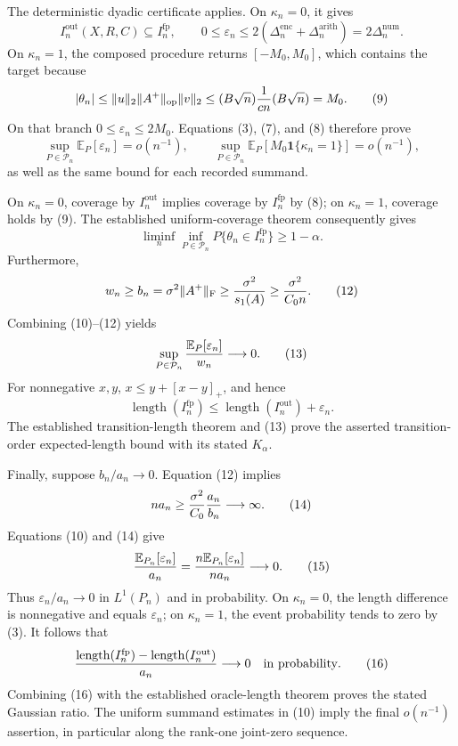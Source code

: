 The deterministic dyadic certificate applies.  On \(\kappa_n=0\), it gives
\[
I_n^{\mathrm{out}}(X,R,C)\subseteq I_n^{\mathrm{fp}},
\qquad
0\le\varepsilon_n
\le2(\Delta_n^{\mathrm{enc}}+\Delta_n^{\mathrm{arith}})
=2\Delta_n^{\mathrm{num}}.                                          \tag{8}
\]
On \(\kappa_n=1\), the composed procedure returns \([-M_0,M_0]\), which
contains the target because
\[
|\theta_n|
\le\|u\|_2\|A^+\|_{
\mathrm{op}}\|v\|_2
\le(B\sqrt n){1\over cn}(B\sqrt n)=M_0.                              \tag{9}
\]
On that branch \(0\le\varepsilon_n\le2M_0\).  Equations (3), (7), and (8)
therefore prove
\[
\sup_{P\in\mathcal P_n}\mathbb E_P[\varepsilon_n]=o(n^{-1}),
\qquad
\sup_{P\in\mathcal P_n}\mathbb E_P[
M_0\mathbf1\{\kappa_n=1\}]=o(n^{-1}),                               \tag{10}
\]
as well as the same bound for each recorded summand.

On \(\kappa_n=0\), coverage by \(I_n^{\mathrm{out}}\) implies coverage by
\(I_n^{\mathrm{fp}}\) by (8); on \(\kappa_n=1\), coverage holds by (9).
The established uniform-coverage theorem consequently gives
\[
\liminf_n\inf_{P\in\mathcal P_n}
P\{\theta_n\in I_n^{\mathrm{fp}}\}\ge1-\alpha.                       \tag{11}
\]
Furthermore,
\[
w_n\ge b_n=\sigma^2\|A^+\|_{
\mathrm F}
\ge{\sigma^2\over s_1(A)}\ge{\sigma^2\over C_0n}.                  \tag{12}
\]
Combining (10)--(12) yields
\[
\sup_{P\in\mathcal P_n}{\mathbb E_P[\varepsilon_n]\over w_n}
\longrightarrow0.                                                    \tag{13}
\]
For nonnegative \(x,y\), \(x\le y+[x-y]_+\), and hence
\[
\operatorname{length}(I_n^{\mathrm{fp}})
\le\operatorname{length}(I_n^{\mathrm{out}})+\varepsilon_n.
\]
The established transition-length theorem and (13) prove the asserted
transition-order expected-length bound with its stated \(K_\alpha\).

Finally, suppose \(b_n/a_n\to0\).  Equation (12) implies
\[
na_n\ge{\sigma^2\over C_0}{a_n\over b_n}\longrightarrow\infty.      \tag{14}
\]
Equations (10) and (14) give
\[
{\mathbb E_{P_n}[\varepsilon_n]\over a_n}
={n\mathbb E_{P_n}[\varepsilon_n]\over na_n}\longrightarrow0.      \tag{15}
\]
Thus \(\varepsilon_n/a_n\to0\) in \(L^1(P_n)\) and in probability.  On
\(\kappa_n=0\), the length difference is nonnegative and equals
\(\varepsilon_n\); on \(\kappa_n=1\), the event probability tends to zero by
(3).  It follows that
\[
{\operatorname{length}(I_n^{\mathrm{fp}})
-\operatorname{length}(I_n^{\mathrm{out}})\over a_n}
\longrightarrow0\quad\hbox{in probability}.                         \tag{16}
\]
Combining (16) with the established oracle-length theorem proves the stated
Gaussian ratio.  The uniform summand estimates in (10) imply the final
\(o(n^{-1})\) assertion, in particular along the rank-one joint-zero sequence.

